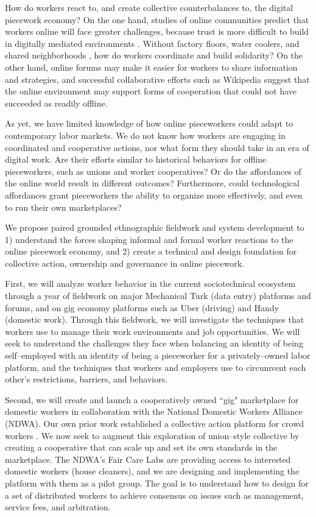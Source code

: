 \documentclass[11pt]{article}
\begin{document}
How do workers react to, and create collective counterbalances to, the digital piecework economy?
On the one hand, studies of online communities predict that workers online will face greater challenges, because trust is more difficult to build in digitally mediated environments
\cite{successfulOnlineCommunities,kollock2005managing,cook2005cooperation}.
Without factory floors, water coolers, and shared neighborhoods
\cite{waterCooler},
how do workers coordinate and build solidarity?
On the other hand,
online forums may make it easier for workers to share information and strategies,
and successful collaborative efforts such as Wikipedia suggest that the online environment may support forms of cooperation that could not have succeeded as readily offline.

As yet,
we have limited knowledge of how online pieceworkers could adapt to contemporary labor markets.
We do not know how workers are engaging in coordinated and cooperative actions,
nor what form they should take in an era of digital work.
Are their efforts similar to historical behaviors for offline pieceworkers,
such as unions and worker cooperatives?
Or do the affordances of the online world result in different outcomes?
Furthermore,
could technological affordances grant pieceworkers the ability to organize more effectively,
and even to run their own marketplaces?

We propose paired grounded ethnographic fieldwork and system development to 1) understand the forces shaping informal and formal worker reactions to the online piecework economy,
and 2) create a technical and design foundation for collective action,
ownership and governance in online piecework.


First, we will analyze worker behavior in the current sociotechnical ecosystem through a year of fieldwork on major Mechanical Turk
(data entry)
platforms and forums,
and on gig economy platforms such as Uber
(driving)
and Handy
(domestic work).
Through this fieldwork, we will investigate the techniques that workers use to manage their work environments and job opportunities.
We will seek to understand the challenges they face when balancing an identity of being self--employed with an identity of being a pieceworker for a privately--owned labor platform, and the techniques that workers and employers use to circumvent each other's restrictions, barriers, and behaviors.

Second, we will create and launch a cooperatively owned ``gig" marketplace for domestic workers in collaboration with the National Domestic Workers Alliance
(NDWA).
Our own prior work established a collective action platform for crowd workers
\cite{dynamo}.
We now seek to augment this exploration of union--style collective by creating a cooperative that can scale up and set its own standards in the marketplace.
The NDWA's Fair Care Labs are providing access to interested domestic workers
(house cleaners), and we are designing and implementing the platform with them as a pilot group.
The goal is to understand how to design for a set of distributed workers to achieve consensus on issues such as management, service fees, and arbitration.
\end{document}
